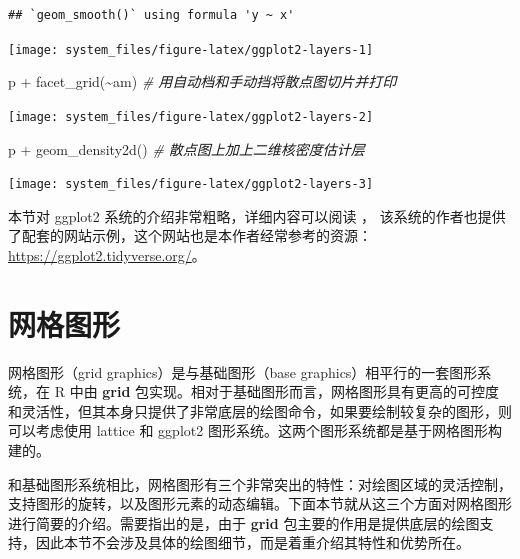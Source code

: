 \documentclass[
  b5paper,
  UTF8,twoside]{book}
\newenvironment{Shaded}{\begin{snugshade}}{\end{snugshade}}
\newcommand{\CommentTok}[1]{\textcolor[rgb]{0.56,0.35,0.01}{\textit{#1}}}
\newcommand{\FunctionTok}[1]{\textcolor[rgb]{0.00,0.00,0.00}{#1}}
\newcommand{\NormalTok}[1]{#1}
\newcommand{\SpecialCharTok}[1]{\textcolor[rgb]{0.00,0.00,0.00}{#1}}
\begin{document}
\begin{verbatim}
## `geom_smooth()` using formula 'y ~ x'
\end{verbatim}

\begin{center}\texttt{[image: system\_files/figure-latex/ggplot2-layers-1]} \end{center}

\begin{Shaded}
\begin{Highlighting}[]
\NormalTok{p }\SpecialCharTok{+} \FunctionTok{facet\_grid}\NormalTok{(}\SpecialCharTok{\textasciitilde{}}\NormalTok{am) }\CommentTok{\# 用自动档和手动挡将散点图切片并打印}
\end{Highlighting}
\end{Shaded}

\begin{center}\texttt{[image: system\_files/figure-latex/ggplot2-layers-2]} \end{center}

\begin{Shaded}
\begin{Highlighting}[]
\NormalTok{p }\SpecialCharTok{+} \FunctionTok{geom\_density2d}\NormalTok{() }\CommentTok{\# 散点图上加上二维核密度估计层}
\end{Highlighting}
\end{Shaded}

\begin{center}\texttt{[image: system\_files/figure-latex/ggplot2-layers-3]} \end{center}

本节对 ggplot2 系统的介绍非常粗略，详细内容可以阅读 \citet{ggplot2}， 该系统的作者也提供了配套的网站示例，这个网站也是本作者经常参考的资源：\url{https://ggplot2.tidyverse.org/}。

\hypertarget{ux7f51ux683cux56feux5f62}{%
\section{网格图形}\label{ux7f51ux683cux56feux5f62}}

网格图形（grid graphics）是与基础图形（base graphics）相平行的一套图形系统，在 R 中由 \textbf{grid} 包实现。相对于基础图形而言，网格图形具有更高的可控度和灵活性，但其本身只提供了非常底层的绘图命令，如果要绘制较复杂的图形，则可以考虑使用 lattice 和 ggplot2 图形系统。这两个图形系统都是基于网格图形构建的。

和基础图形系统相比，网格图形有三个非常突出的特性：对绘图区域的灵活控制，支持图形的旋转，以及图形元素的动态编辑。下面本节就从这三个方面对网格图形进行简要的介绍。需要指出的是，由于 \textbf{grid} 包主要的作用是提供底层的绘图支持，因此本节不会涉及具体的绘图细节，而是着重介绍其特性和优势所在。
\end{document}
